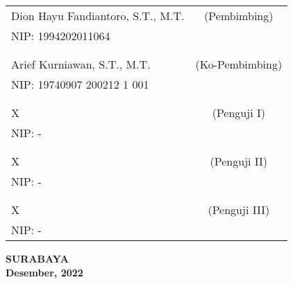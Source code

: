     \noindent
    \begin{tabularx}{\textwidth}{X c}
      Dion Hayu Fandiantoro, S.T., M.T.     & (Pembimbing) \\
      NIP: 1994202011064                    & \\
      &  \\
      &  \\
      Arief Kurniawan, S.T., M.T.           & (Ko-Pembimbing) \\
      NIP: 19740907 200212 1 001            & \\
      &  \\
      &  \\
      X                                     & (Penguji I) \\
      NIP: -                                & \\
      &  \\
      &  \\
      X                                     & (Penguji II) \\
      NIP: -                                & \\
      &  \\
      &  \\
      X                                     & (Penguji III) \\
      NIP: -                                & \\
    \end{tabularx} 
  \endgroup

  \vspace{4ex}

  \begin{center}
    \textbf{SURABAYA} \\
    \textbf{Desember, 2022}
  \end{center}
\endgroup

